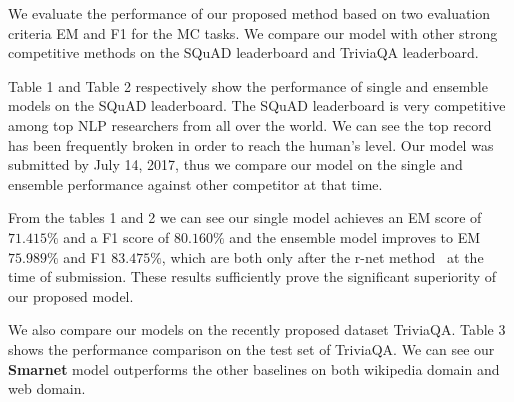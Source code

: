 \documentclass[letterpaper]{article} \usepackage{aaai18}  \usepackage{times}  \usepackage{helvet}  \usepackage{courier}  \usepackage{url}  \usepackage{graphicx}  \usepackage{booktabs}
\begin{document}
We evaluate the performance of our proposed method based on two evaluation criteria EM and F1 for the MC tasks. We compare our model with other strong competitive methods on the SQuAD leaderboard and TriviaQA leaderboard.

Table 1 and Table 2 respectively show the performance of single and ensemble models on the SQuAD leaderboard. The SQuAD leaderboard is very competitive among top NLP researchers from all over the world. We can see the top record has been frequently broken in order to reach the human's level. Our model was submitted by July 14, 2017, thus we compare our model on the single and ensemble performance against other competitor at that time.

From the tables 1 and 2 we can see our single model achieves an EM score of $71.415\%$ and a F1 score of $80.160\%$ and the ensemble model improves to EM $75.989\%$ and F1 $83.475\%$, which are both only after the r-net method~\cite{Wang2017GatedSN} at the time of submission. These results sufficiently prove the significant superiority of our proposed model.

We also compare our models on the recently proposed dataset TriviaQA. Table 3 shows the performance comparison on the test set of TriviaQA. We can see our \textbf{Smarnet} model outperforms the other baselines on both wikipedia domain and web domain.
\end{document}
